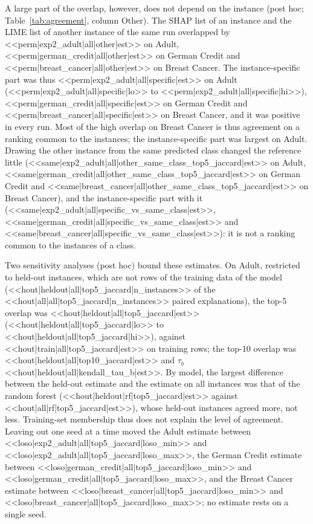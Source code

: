 A large part of the overlap, however, does not depend on the instance (post hoc;
Table~\ref{tab:agreement}, column Other). The SHAP list of an instance and the LIME list
of another instance of the same run overlapped by <<perm|exp2_adult|all|other|est>> on
Adult, <<perm|german_credit|all|other|est>> on German Credit and
<<perm|breast_cancer|all|other|est>> on Breast Cancer. The instance-specific part was thus
<<perm|exp2_adult|all|specific|est>> on Adult (<<perm|exp2_adult|all|specific|lo>> to
<<perm|exp2_adult|all|specific|hi>>), <<perm|german_credit|all|specific|est>> on German
Credit and <<perm|breast_cancer|all|specific|est>> on Breast Cancer, and it was positive in
every run. Most of the high overlap on Breast Cancer is thus agreement on a ranking common
to the instances; the instance-specific part was largest on Adult. Drawing the other
instance from the same predicted class changed the reference little
(<<same|exp2_adult|all|other_same_class_top5_jaccard|est>> on Adult,
<<same|german_credit|all|other_same_class_top5_jaccard|est>> on German Credit and
<<same|breast_cancer|all|other_same_class_top5_jaccard|est>> on Breast Cancer), and the
instance-specific part with it (<<same|exp2_adult|all|specific_vs_same_class|est>>,
<<same|german_credit|all|specific_vs_same_class|est>> and
<<same|breast_cancer|all|specific_vs_same_class|est>>): it is not a ranking common to the
instances of a class.

Two sensitivity analyses (post hoc) bound these estimates. On Adult, restricted to held-out instances, which are not rows of the training data of the model
(<<hout|heldout|all|top5_jaccard|n_instances>> of the
<<hout|all|all|top5_jaccard|n_instances>> paired explanations), the top-5 overlap was <<hout|heldout|all|top5_jaccard|est>>
(<<hout|heldout|all|top5_jaccard|lo>> to <<hout|heldout|all|top5_jaccard|hi>>), against
<<hout|train|all|top5_jaccard|est>> on training rows; the top-10 overlap was
<<hout|heldout|all|top10_jaccard|est>> and $\tau_b$ <<hout|heldout|all|kendall_tau_b|est>>.
By model, the largest difference between the held-out estimate and the estimate on all
instances was that of the random forest (<<hout|heldout|rf|top5_jaccard|est>> against
<<hout|all|rf|top5_jaccard|est>>), whose held-out instances agreed more, not less. Training-set membership thus does not explain the
level of agreement. Leaving out one seed at a time moved the Adult estimate between
<<loso|exp2_adult|all|top5_jaccard|loso_min>> and
<<loso|exp2_adult|all|top5_jaccard|loso_max>>, the German Credit estimate between
<<loso|german_credit|all|top5_jaccard|loso_min>> and
<<loso|german_credit|all|top5_jaccard|loso_max>>, and the Breast Cancer estimate between
<<loso|breast_cancer|all|top5_jaccard|loso_min>> and
<<loso|breast_cancer|all|top5_jaccard|loso_max>>; no estimate rests on a single seed.

